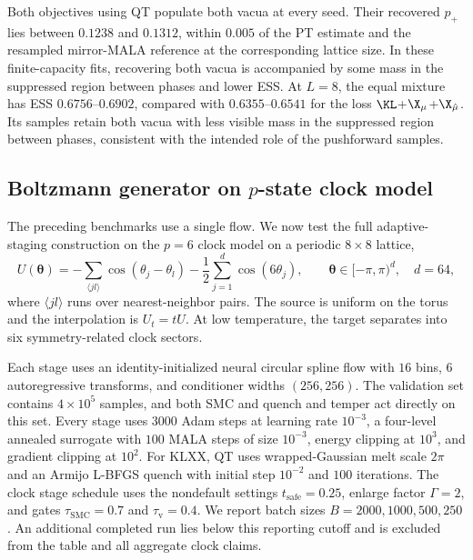 \documentclass{article}
\begin{document}
Both objectives using QT populate both vacua at every seed. Their recovered $p_+$ lies between $0.1238$ and $0.1312$, within $0.005$ of the PT estimate and the resampled mirror-MALA reference at the corresponding lattice size. In these finite-capacity fits, recovering both vacua is accompanied by some mass in the suppressed region between phases and lower ESS. At $L=8$, the equal mixture has ESS $0.6756$--$0.6902$, compared with $0.6355$--$0.6541$ for the loss $\KL$+$\X_\mu$+$\X_{\hat\mu}$. Its samples retain both vacua with less visible mass in the suppressed region between phases, consistent with the intended role of the pushforward samples.

\subsection{Boltzmann generator on \texorpdfstring{$p$}{p}-state clock model}
\label{subsec: clock}

The preceding benchmarks use a single flow. We now test the full adaptive-staging construction on the $p=6$ clock model on a periodic $8\times8$ lattice,
\begin{equation}
U(\boldsymbol\theta)
=-\sum_{\langle jl\rangle}\cos(\theta_j-\theta_l)
-\frac12\sum_{j=1}^{d}\cos(6\theta_j),
\qquad \boldsymbol\theta\in[-\pi,\pi)^{d},\quad d=64,
\label{eq: clock-potential}
\end{equation}
where $\langle jl\rangle$ runs over nearest-neighbor pairs. The source is uniform on the torus and the interpolation is $U_t=tU$. At low temperature, the target separates into six symmetry-related clock sectors.

Each stage uses an identity-initialized neural circular spline flow with $16$ bins, $6$ autoregressive transforms, and conditioner widths $(256,256)$. The validation set contains $4\times10^5$ samples, and both SMC and quench and temper act directly on this set. Every stage uses $3000$ Adam steps at learning rate $10^{-3}$, a four-level annealed surrogate with $100$ MALA steps of size $10^{-3}$, energy clipping at $10^3$, and gradient clipping at $10^2$. For KLXX, QT uses wrapped-Gaussian melt scale $2\pi$ and an Armijo L-BFGS quench with initial step $10^{-2}$ and $100$ iterations. The clock stage schedule uses the nondefault settings $t_{\mathrm{safe}}=0.25$, enlarge factor $\Gamma=2$, and gates $\tau_{\mathrm{SMC}}=0.7$ and $\tau_{\mathrm v}=0.4$. We report batch sizes $B=2000,1000,500,250$. An additional completed run lies below this reporting cutoff and is excluded from the table and all aggregate clock claims.
\end{document}
